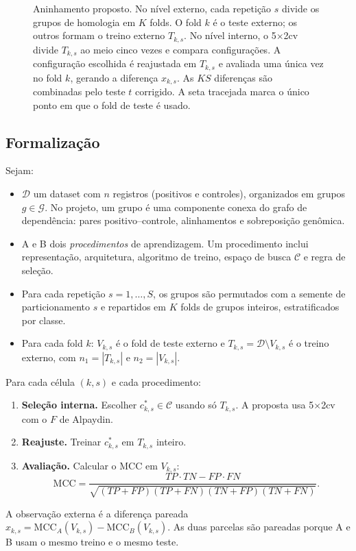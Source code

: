 \documentclass[11pt,a4paper]{article}
\newcommand{\MCC}{\mathrm{MCC}}
\begin{document}
\begin{figure}[t]
\centering

\caption{Aninhamento proposto. No nível externo, cada repetição $s$ divide os grupos de homologia em $K$ folds. O fold $k$ é o teste externo; os outros formam o treino externo $T_{k,s}$. No nível interno, o 5$\times$2cv divide $T_{k,s}$ ao meio cinco vezes e compara configurações. A configuração escolhida é reajustada em $T_{k,s}$ e avaliada uma única vez no fold $k$, gerando a diferença $x_{k,s}$. As $KS$ diferenças são combinadas pelo teste $t$ corrigido. A seta tracejada marca o único ponto em que o fold de teste é usado.}
\label{fig:aninhamento}
\end{figure}

\subsection{Formalização}

Sejam:
\begin{itemize}[leftmargin=1.4em]
\item $\mathcal{D}$ um dataset com $n$ registros (positivos e controles), organizados em grupos $g\in\mathcal{G}$. No projeto, um grupo é uma componente conexa do grafo de dependência: pares positivo--controle, alinhamentos e sobreposição genômica.
\item A e B dois \emph{procedimentos} de aprendizagem. Um procedimento inclui representação, arquitetura, algoritmo de treino, espaço de busca $\mathcal{C}$ e regra de seleção.
\item Para cada repetição $s=1,\dots,S$, os grupos são permutados com a semente de particionamento $s$ e repartidos em $K$ folds de grupos inteiros, estratificados por classe.
\item Para cada fold $k$: $V_{k,s}$ é o fold de teste externo e $T_{k,s}=\mathcal{D}\setminus V_{k,s}$ é o treino externo, com $n_1=|T_{k,s}|$ e $n_2=|V_{k,s}|$.
\end{itemize}

Para cada célula $(k,s)$ e cada procedimento:
\begin{enumerate}[leftmargin=1.4em]
\item \textbf{Seleção interna.} Escolher $c^\ast_{k,s}\in\mathcal{C}$ usando só $T_{k,s}$. A proposta usa 5$\times$2cv com o $F$ de Alpaydin.
\item \textbf{Reajuste.} Treinar $c^\ast_{k,s}$ em $T_{k,s}$ inteiro.
\item \textbf{Avaliação.} Calcular o MCC em $V_{k,s}$:
\begin{equation}
\MCC=\frac{TP\cdot TN-FP\cdot FN}{\sqrt{(TP+FP)(TP+FN)(TN+FP)(TN+FN)}}.
\end{equation}
\end{enumerate}
A observação externa é a diferença pareada $x_{k,s}=\MCC_A(V_{k,s})-\MCC_B(V_{k,s})$. As duas parcelas são pareadas porque A e B usam o mesmo treino e o mesmo teste.
\end{document}
